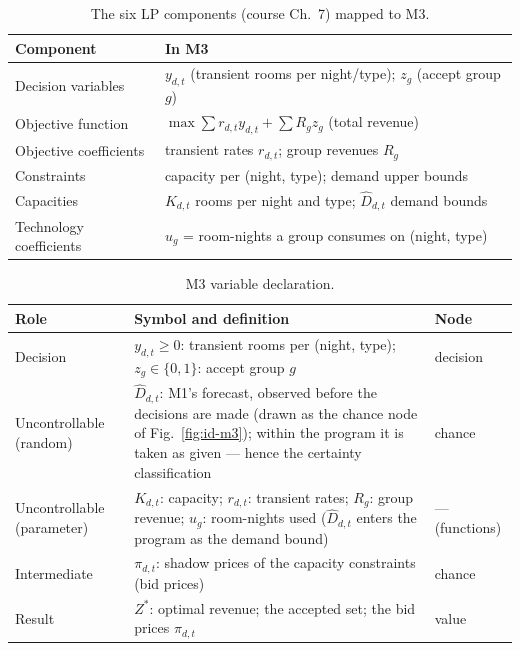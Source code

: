 \begin{table}[H]
\centering
\caption{The six LP components (course Ch.~7) mapped to M3.}
\label{tab:lpcomponents}
\begin{tabularx}{\textwidth}{@{}l X@{}}
\toprule
\textbf{Component} & \textbf{In M3} \\
\midrule
Decision variables & $y_{d,t}$ (transient rooms per night/type); $z_g$ (accept group $g$) \\
Objective function & $\max \sum r_{d,t} y_{d,t} + \sum R_g z_g$ (total revenue) \\
Objective coefficients & transient rates $r_{d,t}$; group revenues $R_g$ \\
Constraints & capacity per (night, type); demand upper bounds \\
Capacities & $K_{d,t}$ rooms per night and type; $\hat{D}_{d,t}$ demand bounds \\
Technology coefficients & $u_g$ = room-nights a group consumes on (night, type) \\
\bottomrule
\end{tabularx}
\end{table}

\begin{table}[H]
\centering
\caption{M3 variable declaration.}
\label{tab:m3vars}
\begin{tabularx}{0.92\textwidth}{@{}l X l@{}}
\toprule
\textbf{Role} & \textbf{Symbol and definition} & \textbf{Node} \\
\midrule
Decision & $y_{d,t} \ge 0$: transient rooms per (night, type); $z_g \in \{0,1\}$: accept group $g$ & decision \\
Uncontrollable (random) & $\hat{D}_{d,t}$: M1's forecast, observed before the decisions are made (drawn as the chance node of Fig.~\ref{fig:id-m3}); within the program it is taken as given --- hence the certainty classification & chance \\
Uncontrollable (parameter) & $K_{d,t}$: capacity; $r_{d,t}$: transient rates; $R_g$: group revenue; $u_g$: room-nights used ($\hat{D}_{d,t}$ enters the program as the demand bound) & --- (functions) \\
Intermediate & $\pi_{d,t}$: shadow prices of the capacity constraints (bid prices) & chance \\
Result & $Z^{*}$: optimal revenue; the accepted set; the bid prices $\pi_{d,t}$ & value \\
\bottomrule
\end{tabularx}
\end{table}

